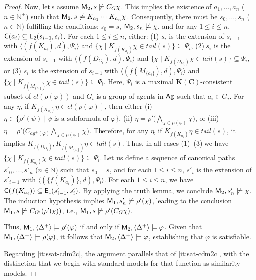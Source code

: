 \documentclass{article}
\newcommand{\ag}{\text{\normalfont\textsf{Ag}}\xspace}
\newcommand{\CC}{\textnormal{\sf C}\xspace}
\newcommand{\CE}{\textnormal{\sf E}\xspace}
\newcommand{\CM}{\textnormal{\sf M}\xspace}
\renewcommand{\phi}{\varphi}
\newcommand{\mbN}{\mathbb{N}}
\newcommand{\lscdm}{\text{\normalfont ELCDM$^s$}\xspace}
\newcommand{\KC}{\ensuremath{\mathbf{K(C)}}\xspace}
\begin{document}
\begin{proof}
Now, let's assume $\CM_2,s\not\models C_G\chi$. This implies the existence of $a_1,\dots,a_n$ ($n\in\mbN^+$) such that $\CM_2,s\not\models K_{a_1}\cdots K_{a_n}\chi$. Consequently, there must be $s_0,\dots,s_n$ ($n\in\mbN$) fulfilling the conditions: $s_0=s$, $\CM_2,s_n\not\models \chi$, and for any $1\leq i\leq n$, $\CC(a_i)\subseteq \CE_2(s_{i-1},s_i)$. For each $1\leq i\leq n$, either: (1) $s_i$ is the extension of $s_{i-1}$ with $\langle ({f(K_{a_i})},d), \Psi_i \rangle$ and $\{\chi\mid K_{f(K_{a_i})}\chi \in tail(s)\} \subseteq \Psi_i$, (2) $s_i$ is the extension of $s_{i-1}$ with $\langle ({f(D_{G_i})},d), \Psi_i \rangle$ and $\{\chi\mid K_{f(D_{G_i})}\chi \in tail(s)\} \subseteq \Psi_i$, or (3) $s_i$ is the extension of $s_{i-1}$ with $\langle (f(M_{\{a_i\}}), d), \Psi_i \rangle$ and $\{ \chi \mid K_{f (M_{\{a_i\}})} \chi \in tail(s)\} \subseteq \Psi_i$. Here, $\Psi_i$ is a maximal \KC-consistent subset of $cl(\rho(\phi))$ and $G_i$ is a group of agents in $\ag$ such that $a_i\in G_i$. For any $\eta$, if $K_{f(K_{a_i})}\eta\in cl(\rho(\phi))$, then either (i) $\eta \in \{ \rho'(\psi) \mid \text{$\psi$ is a subformula of $\phi$} \}$, (ii) $\eta=\rho'\big(\bigwedge_{\chi \in \mu(\phi)} \chi \big)$, or (iii) $\eta=\rho'\big(C_{ag^+(\phi)}\bigwedge_{\chi \in \mu(\phi)} \chi \big)$. Therefore, for any $\eta$, if $K_{f(K_{a_i})}\eta\in tail(s)$, it implies $K_{f(D_{G_i})}, K_{f(M_{\{a_i\}})}\eta\in tail(s)$. Thus, in all cases (1)--(3) we have $\{\chi\mid K_{f(K_{a_i})}\chi \in tail(s)\} \subseteq \Psi_i$. 
Let us define a sequence of canonical paths $s'_0,\dots,s'_n$ ($n\in\mbN$) such that $s_0=s$, and for each $1 \leq i \leq n$, $s'_i$ is the extension of $s'_{i-1}$ with $\langle (\{f(K_{a_i})\},d), \Psi_i \rangle$. For each $1\leq i\leq n$, we have $\CC(f(K_{a_i}))\subseteq \CE_1(s'_{i-1},s'_i)$. By applying the truth lemma, we conclude $\CM_2,s'_n\not\models \chi$. The induction hypothesis implies $\CM_1,s'_n\not\models \rho'(\chi)$, leading to the conclusion $\CM_1,s\not\models C_{G'}(\rho'(\chi))$, i.e., $\CM_1,s\not\models \rho'(C_G\chi)$.

Thus, $\CM_1,\langle\Delta^+\rangle\models \rho'(\phi)$ if and only if $\CM_2,\langle\Delta^+\rangle\models \phi$. Given that $\CM_1,\langle\Delta^+\rangle\models \rho(\phi)$, it follows that $\CM_2,\langle\Delta^+\rangle\models \phi$, establishing that $\phi$ is satisfiable.

Regarding \ref{it:ssat-cdm2c}, the argument parallels that of \ref{it:sat-cdm2c}, with the distinction that we begin with standard models for \lscdm that function as similarity models.
\end{proof}
\end{document}
